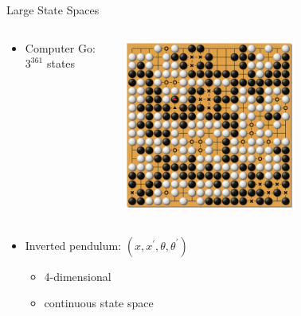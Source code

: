 \documentclass[11pt,table]{beamer}
\begin{document}
    \begin{frame}{Large State Spaces}

\begin{columns}[T]
\begin{column}{0.6\textwidth}
\begin{itemize}
    
 \item  Computer Go: $3^{361}$ states
 \end{itemize}
\end{column}
\begin{column}{0.4\textwidth}
\centering
\includegraphics[width=0.6\textwidth]{figures/go.png}
\end{column}
\end{columns}

\begin{columns}[T]
\begin{column}{0.6\textwidth}
\begin{itemize}
    \item Inverted pendulum: $\left(x, x^{\prime}, \theta, \theta^{\prime}\right)$
\begin{itemize}
     
 \item 4-dimensional

\item continuous state space 
\end{itemize}
\end{itemize}
\end{column}
\begin{column}{0.4\textwidth}
\vspace{5mm}
\centering
\scalebox{0.25}{
\begin{tikzpicture}[line cap=round,line join=round,scale=2]


\end{tikzpicture}}
\end{column}
\end{columns}
\end{frame}
\end{document}
